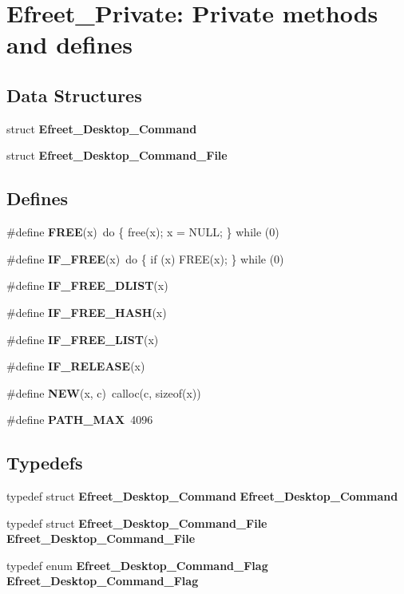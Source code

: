 \section{Efreet\_\-Private: Private methods and defines}
\label{group__Efreet__Private}


\subsection*{Data Structures}
\begin{CompactItemize}
\item 
struct {\bf Efreet\_\-Desktop\_\-Command}
\item 
struct {\bf Efreet\_\-Desktop\_\-Command\_\-File}
\end{CompactItemize}
\subsection*{Defines}
\begin{CompactItemize}
\item 
\#define {\bf FREE}(x)~do \{ free(x); x = NULL; \} while (0)
\item 
\#define {\bf IF\_\-FREE}(x)~do \{ if (x) FREE(x); \} while (0)
\item 
\#define {\bf IF\_\-FREE\_\-DLIST}(x)
\item 
\#define {\bf IF\_\-FREE\_\-HASH}(x)
\item 
\#define {\bf IF\_\-FREE\_\-LIST}(x)
\item 
\#define {\bf IF\_\-RELEASE}(x)
\item 
\#define {\bf NEW}(x, c)~calloc(c, sizeof(x))
\item 
\#define {\bf PATH\_\-MAX}~4096
\end{CompactItemize}
\subsection*{Typedefs}
\begin{CompactItemize}
\item 
typedef struct {\bf Efreet\_\-Desktop\_\-Command} {\bf Efreet\_\-Desktop\_\-Command}
\item 
typedef struct {\bf Efreet\_\-Desktop\_\-Command\_\-File} {\bf Efreet\_\-Desktop\_\-Command\_\-File}
\item 
typedef enum {\bf Efreet\_\-Desktop\_\-Command\_\-Flag} {\bf Efreet\_\-Desktop\_\-Command\_\-Flag}
\end{CompactItemize}
